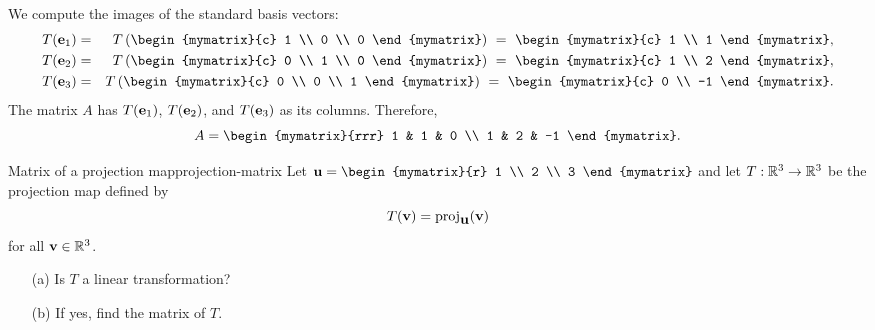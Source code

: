 \begin{solution}
  We compute the images of the standard basis vectors:
  \begin{eqnarray*}
    T(\vect{e}_1)
    &=& T\paren{\begin{mymatrix}{c} 1 \\ 0 \\ 0 \end{mymatrix}}
    ~=~ \begin{mymatrix}{c} 1 \\ 1 \end{mymatrix},\\
    T(\vect{e}_2)
    &=& T\paren{\begin{mymatrix}{c} 0 \\ 1 \\ 0 \end{mymatrix}}
    ~=~ \begin{mymatrix}{c} 1 \\ 2 \end{mymatrix},\\
    T(\vect{e}_3)
    &=& T\paren{\begin{mymatrix}{c} 0 \\ 0 \\ 1 \end{mymatrix}}
    ~=~ \begin{mymatrix}{c} 0 \\ -1 \end{mymatrix}.
  \end{eqnarray*}
  The matrix $A$ has $T(\mbox{\bf e}_1)$, $T(\mbox{\bf e}_2)$, and
  $T(\mbox{\bf e}_3)$ as its columns. Therefore,
  \begin{equation*}
    A=\begin{mymatrix}{rrr}
      1 & 1 & 0 \\
      1 & 2 & -1
    \end{mymatrix}.
  \end{equation*}
\end{solution}

\begin{example}{Matrix of a projection map}{projection-matrix}
  Let $\vect{u} = \begin{mymatrix}{r} 1 \\ 2 \\ 3 \end{mymatrix}$ and
  let $T: \mathbb{R}^3 \to \mathbb{R}^3$ be the projection%
   map defined by
  \begin{equation*}
    T(\vect{v}) = \proj_{\vect{u}}(\vect{v})
  \end{equation*}
  for all $\mbox{\bf v} \in \mathbb{R}^3$.
  \begin{enumerate}
  \item[(a)] Is $T$ a linear transformation?
  \item[(b)] If yes, find the matrix of $T$.
  \end{enumerate}
\end{example}


